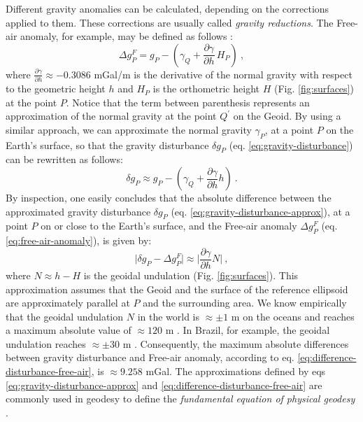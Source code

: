 \documentclass[extra]{gji}
\begin{document}
Different gravity anomalies can be calculated,
depending on the corrections applied to them.
These corrections are usually called \textit{gravity reductions}.
The Free-air anomaly, for example, may be defined as
follows \citep{blakely1996, hofmann-wellenhof-moritz2005}:
\begin{equation}
\Delta g_{P}^{F}
= g_{P} - \left( \gamma_{Q} + \frac{\partial \gamma}{\partial h} \, H_{P} \right) \: ,
\label{eq:free-air-anomaly}
\end{equation}
where $\frac{\partial \gamma}{\partial h} \approx -0.3086$ mGal/m is the
derivative of the normal gravity with respect to the geometric height $h$
and $H_{P}$ is the orthometric height $H$ (Fig. \ref{fig:surfaces}) at the
point $P$.
Notice that the term between parenthesis represents an
approximation of the normal gravity at the point $Q^{\prime}$ on the
Geoid. By using a similar approach, we can approximate the normal gravity
$\gamma_{P}$, at a point $P$ on the Earth's surface, so that the
gravity disturbance $\delta g_{P}$ (eq. \ref{eq:gravity-disturbance})
can be rewritten as follows:
\begin{equation}
\delta g_{P} \approx g_{P} -
\left( \gamma_{Q} + \frac{\partial \gamma}{\partial h} h \right) \: .
\label{eq:gravity-disturbance-approx}
\end{equation}
By inspection, one easily concludes that the absolute difference
between the approximated gravity disturbance $\delta g_{P}$
(eq. \ref{eq:gravity-disturbance-approx}), at a point $P$ on or close to
the Earth's surface, and the Free-air anomaly
$\Delta g_{P}^{F}$ (eq. \ref{eq:free-air-anomaly}), is given by:
\begin{equation}
\vert \delta g_{P} - \Delta g^{F}_{P} \vert \approx
\vert \frac{\partial \gamma}{\partial h} N \vert \: ,
\label{eq:difference-disturbance-free-air}
\end{equation}
where $N \approx h - H$ is the geoidal undulation (Fig. \ref{fig:surfaces}).
This approximation assumes that the Geoid and the surface of
the reference ellipsoid are approximately parallel at $P$
and the surrounding area.
We know empirically that the geoidal undulation $N$ in the world
is $\approx \pm 1$ m on the oceans and reaches a
maximum absolute value of $\approx 120$ m \citep[e.g.,][]{torge2012,
sanso_sideris2013}. In Brazil, for example, the geoidal undulation
reaches $\approx \pm 30$ m \citep{ibge_mapgeo2015}. Consequently, the
maximum absolute differences between gravity disturbance and
Free-air anomaly, according to eq. \ref{eq:difference-disturbance-free-air},
is $\approx 9.258$ mGal.
The approximations defined by eqs \ref{eq:gravity-disturbance-approx}
and \ref{eq:difference-disturbance-free-air} are commonly used
in geodesy to define the \textit{fundamental equation of physical
geodesy} \citep{hofmann-wellenhof-moritz2005}.
\end{document}
